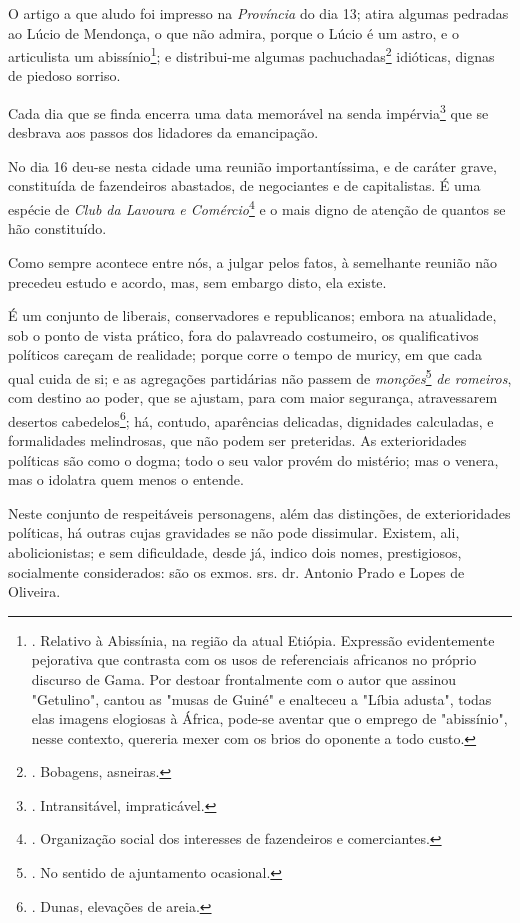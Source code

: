 O artigo a que aludo foi impresso na \emph{Província} do dia 13; atira
algumas pedradas ao Lúcio de Mendonça, o que não admira, porque o Lúcio
é um astro, e o articulista um abissínio\footnote{. Relativo à
  Abissínia, na região da atual Etiópia. Expressão evidentemente
  pejorativa que contrasta com os usos de referenciais africanos no
  próprio discurso de Gama. Por destoar frontalmente com o autor que
  assinou "Getulino", cantou as "musas de Guiné" e enalteceu a "Líbia
  adusta", todas elas imagens elogiosas à África, pode-se aventar que o
  emprego de "abissínio", nesse contexto, quereria mexer com os brios do
  oponente a todo custo.}; e distribui-me algumas pachuchadas\footnote{.
  Bobagens, asneiras.} idióticas, dignas de piedoso sorriso.

Cada dia que se finda encerra uma data memorável na senda
impérvia\footnote{. Intransitável, impraticável.} que se desbrava aos
passos dos lidadores da emancipação.

No dia 16 deu-se nesta cidade uma reunião importantíssima, e de caráter
grave, constituída de fazendeiros abastados, de negociantes e de
capitalistas. É uma espécie de \emph{Club da Lavoura e
Comércio}\footnote{. Organização social dos interesses de fazendeiros e
  comerciantes.} e o mais digno de atenção de quantos se hão
constituído.

Como sempre acontece entre nós, a julgar pelos fatos, à semelhante
reunião não precedeu estudo e acordo, mas, sem embargo disto, ela
existe.

É um conjunto de liberais, conservadores e republicanos; embora na
atualidade, sob o ponto de vista prático, fora do palavreado costumeiro,
os qualificativos políticos careçam de realidade; porque corre o tempo
de muricy, em que cada qual cuida de si; e as agregações partidárias não
passem de \emph{monções}\footnote{. No sentido de ajuntamento ocasional.}
\emph{de romeiros}, com destino ao poder, que se ajustam, para com maior
segurança, atravessarem desertos cabedelos\footnote{. Dunas, elevações
  de areia.}; há, contudo, aparências delicadas, dignidades calculadas,
e formalidades melindrosas, que não podem ser preteridas. As
exterioridades políticas são como o dogma; todo o seu valor provém do
mistério; mas o venera, mas o idolatra quem menos o entende.

Neste conjunto de respeitáveis personagens, além das distinções, de
exterioridades políticas, há outras cujas gravidades se não pode
dissimular. Existem, ali, abolicionistas; e sem dificuldade, desde já,
indico dois nomes, prestigiosos, socialmente considerados: são os exmos.
srs. dr. Antonio Prado e Lopes de Oliveira.

